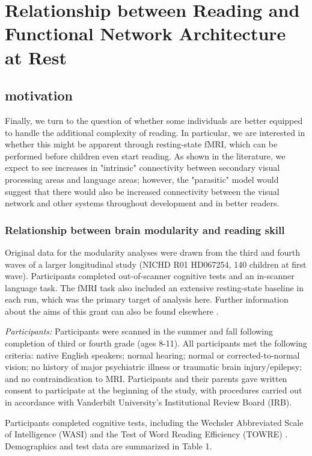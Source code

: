 \chapter{Relationship between Reading and Functional Network Architecture at Rest}

\section{motivation}

Finally, we turn to the question of whether some individuals are better equipped to handle the additional complexity of reading. In particular, we are interested in whether this  might be apparent through resting-state fMRI, which can be performed before children even start reading. As shown in the literature, we expect to see increases in "intrinsic" connectivity between secondary visual processing areas and language areas; however, the "parasitic" model would suggest that there would also be increased connectivity between the visual network and other systems throughout development and in better readers. 


\subsection{Relationship between brain modularity and reading skill}
Original data for the modularity analyses were drawn from the third and fourth waves of a larger longitudinal study (NICHD R01 HD067254, 140 children at first wave). Participants completed out-of-scanner cognitive tests and an in-scanner language task. The fMRI task also included an extensive resting-state baseline in each run, which was the primary target of analysis here. Further information about the aims of this grant can also be found elsewhere \citep{Aboud2016, Wendelken2017}.

\emph{Participants:} Participants were scanned in the summer and fall following completion of third or fourth grade (ages 8-11). All participants met the following criteria: native English speakers; normal hearing; normal or corrected-to-normal vision; no history of major psychiatric illness or traumatic brain injury/epilepsy; and no contraindication to MRI. Participants and their parents gave written consent to participate at the beginning of the study, with procedures carried out in accordance with Vanderbilt University’s Institutional Review Board (IRB). 

Participants completed cognitive tests, including the Wechsler Abbreviated Scale of Intelligence (WASI) \citep{Kaplan1999} and the Test of Word Reading Efficiency (TOWRE) \citep{Torgesen2012}. Demographics and test data are summarized in Table 1. 

